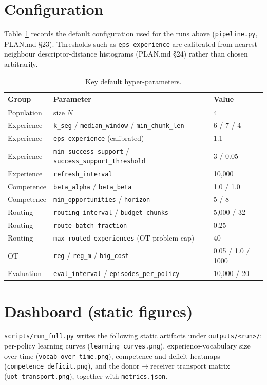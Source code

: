 \documentclass[11pt]{article}
\newcommand{\code}[1]{\texttt{#1}}
\begin{document}
\section{Configuration}
Table~\ref{tab:config} records the default configuration used for the runs above
(\code{pipeline.py}, PLAN.md \S23). Thresholds such as \code{eps\_experience}
are calibrated from nearest-neighbour descriptor-distance histograms
(PLAN.md \S24) rather than chosen arbitrarily.

\begin{table}[h]
\centering
\caption{Key default hyper-parameters.}
\label{tab:config}
\small
\begin{tabular}{l l l}
\toprule
\textbf{Group} & \textbf{Parameter} & \textbf{Value} \\
\midrule
Population   & size $N$ & 4 \\
Experience   & \code{k\_seg} / \code{median\_window} / \code{min\_chunk\_len} & 6 / 7 / 4 \\
Experience   & \code{eps\_experience} (calibrated) & 1.1 \\
Experience   & \code{min\_success\_support} / \code{success\_support\_threshold} & 3 / 0.05 \\
Experience   & \code{refresh\_interval} & 10{,}000 \\
Competence   & \code{beta\_alpha} / \code{beta\_beta} & 1.0 / 1.0 \\
Competence   & \code{min\_opportunities} / \code{horizon} & 5 / 8 \\
Routing      & \code{routing\_interval} / \code{budget\_chunks} & 5{,}000 / 32 \\
Routing      & \code{route\_batch\_fraction} & 0.25 \\
Routing      & \code{max\_routed\_experiences} (OT problem cap) & 40 \\
OT           & \code{reg} / \code{reg\_m} / \code{big\_cost} & 0.05 / 1.0 / 1000 \\
Evaluation   & \code{eval\_interval} / \code{episodes\_per\_policy} & 10{,}000 / 20 \\
\bottomrule
\end{tabular}
\end{table}

\section{Dashboard (static figures)}
\label{sec:dashboard}
\code{scripts/run\_full.py} writes the following static artifacts under
\code{outputs/<run>/}: per-policy learning curves
(\code{learning\_curves.png}), experience-vocabulary size over time
(\code{vocab\_over\_time.png}), competence and deficit heatmaps
(\code{competence\_deficit.png}), and the donor$\to$receiver transport matrix
(\code{uot\_transport.png}), together with \code{metrics.json}.
\end{document}
